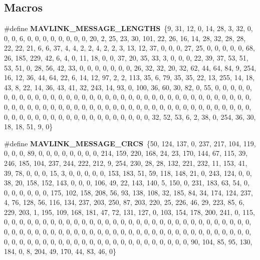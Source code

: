 \subsection*{Macros}
\begin{DoxyCompactItemize}
\item 
\#define \textbf{ M\+A\+V\+L\+I\+N\+K\+\_\+\+M\+E\+S\+S\+A\+G\+E\+\_\+\+L\+E\+N\+G\+T\+HS}~\{9, 31, 12, 0, 14, 28, 3, 32, 0, 0, 0, 6, 0, 0, 0, 0, 0, 0, 0, 0, 20, 2, 25, 23, 30, 101, 22, 26, 16, 14, 28, 32, 28, 28, 22, 22, 21, 6, 6, 37, 4, 4, 2, 2, 4, 2, 2, 3, 13, 12, 37, 0, 0, 0, 27, 25, 0, 0, 0, 0, 0, 68, 26, 185, 229, 42, 6, 4, 0, 11, 18, 0, 0, 37, 20, 35, 33, 3, 0, 0, 0, 22, 39, 37, 53, 51, 53, 51, 0, 28, 56, 42, 33, 0, 0, 0, 0, 0, 0, 0, 26, 32, 32, 20, 32, 62, 44, 64, 84, 9, 254, 16, 12, 36, 44, 64, 22, 6, 14, 12, 97, 2, 2, 113, 35, 6, 79, 35, 35, 22, 13, 255, 14, 18, 43, 8, 22, 14, 36, 43, 41, 32, 243, 14, 93, 0, 100, 36, 60, 30, 82, 0, 55, 0, 0, 0, 0, 0, 0, 0, 0, 0, 0, 0, 0, 0, 0, 0, 0, 0, 0, 0, 0, 0, 0, 0, 0, 0, 0, 0, 0, 0, 0, 0, 0, 0, 0, 0, 0, 0, 0, 0, 0, 0, 0, 0, 0, 0, 0, 0, 0, 0, 0, 0, 0, 0, 0, 0, 0, 0, 0, 0, 0, 0, 0, 0, 0, 0, 0, 0, 0, 0, 0, 0, 0, 0, 0, 0, 0, 0, 0, 0, 0, 0, 0, 0, 0, 0, 0, 0, 0, 32, 52, 53, 6, 2, 38, 0, 254, 36, 30, 18, 18, 51, 9, 0\}
\item 
\#define \textbf{ M\+A\+V\+L\+I\+N\+K\+\_\+\+M\+E\+S\+S\+A\+G\+E\+\_\+\+C\+R\+CS}~\{50, 124, 137, 0, 237, 217, 104, 119, 0, 0, 0, 89, 0, 0, 0, 0, 0, 0, 0, 0, 214, 159, 220, 168, 24, 23, 170, 144, 67, 115, 39, 246, 185, 104, 237, 244, 222, 212, 9, 254, 230, 28, 28, 132, 221, 232, 11, 153, 41, 39, 78, 0, 0, 0, 15, 3, 0, 0, 0, 0, 0, 153, 183, 51, 59, 118, 148, 21, 0, 243, 124, 0, 0, 38, 20, 158, 152, 143, 0, 0, 0, 106, 49, 22, 143, 140, 5, 150, 0, 231, 183, 63, 54, 0, 0, 0, 0, 0, 0, 0, 175, 102, 158, 208, 56, 93, 138, 108, 32, 185, 84, 34, 174, 124, 237, 4, 76, 128, 56, 116, 134, 237, 203, 250, 87, 203, 220, 25, 226, 46, 29, 223, 85, 6, 229, 203, 1, 195, 109, 168, 181, 47, 72, 131, 127, 0, 103, 154, 178, 200, 241, 0, 115, 0, 0, 0, 0, 0, 0, 0, 0, 0, 0, 0, 0, 0, 0, 0, 0, 0, 0, 0, 0, 0, 0, 0, 0, 0, 0, 0, 0, 0, 0, 0, 0, 0, 0, 0, 0, 0, 0, 0, 0, 0, 0, 0, 0, 0, 0, 0, 0, 0, 0, 0, 0, 0, 0, 0, 0, 0, 0, 0, 0, 0, 0, 0, 0, 0, 0, 0, 0, 0, 0, 0, 0, 0, 0, 0, 0, 0, 0, 0, 0, 0, 0, 0, 0, 0, 0, 0, 0, 90, 104, 85, 95, 130, 184, 0, 8, 204, 49, 170, 44, 83, 46, 0\}
\item 

\end{DoxyCompactItemize}
